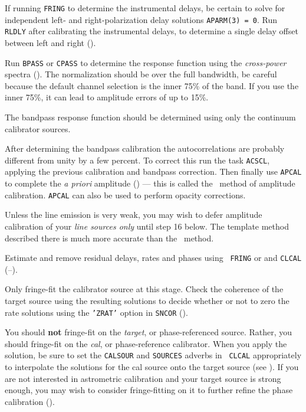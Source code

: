 If running {\tt FRING} to determine the instrumental delays,
be certain to solve for independent left-
and right-polarization delay solutions {\tt APARM(3) = 0}.  Run {\tt
RLDLY} after calibrating the instrumental delays, to determine a
single delay offset between left and right 
().

Run {\tt BPASS} or {\tt CPASS} to determine the 
response function using the {\it cross-power} spectra ().
The normalization should be over the full bandwidth, be careful because
the default channel selection is the inner 75\% of the band.  If you
use the inner 75\%, it can lead to amplitude errors of up to 15\%.

 The bandpass response function should be
determined using only the continuum calibrator sources.  

After determining the bandpass calibration  the autocorrelations are
probably different from unity by a few percent.  To correct this run
the task {\tt ACSCL}, applying the previous calibration and bandpass
correction.  Then finally use {\tt {APCAL}} to complete the {\it a
priori\/} amplitude  () --- this is
called the \Tsys\ method of amplitude calibration.  {\tt APCAL} can
also be used to perform opacity corrections.

Unless the line emission is very weak, you may wish to defer amplitude
calibration of your {\it line sources only\/} until step 16 below.  The
template method described there is much more accurate than the
\Tsys\ method.

Estimate and remove residual delays, rates and phases using {\tt
FRING} or {\tt {}}  and {\tt CLCAL}
(--).

Only fringe-fit the calibrator source at this stage.  Check the
coherence of the target source using the resulting solutions to decide
whether or not to zero the rate solutions using the {\tt 'ZRAT'}
option in {\tt SNCOR} ().

You should {\bf not} fringe-fit on the {\it target\/}, or
phase-referenced source.  Rather, you should fringe-fit on the {\it
cal\/}, or phase-reference calibrator.  When you apply the solution,
be sure to set the {\tt CALSOUR} and {\tt SOURCES} adverbs in {\tt
CLCAL} appropriately to interpolate the solutions for the cal source
onto the target source (see ).  If you are not interested
in astrometric calibration and your target source is strong enough,
you may wish to consider fringe-fitting on it to further refine the
phase calibration ().

